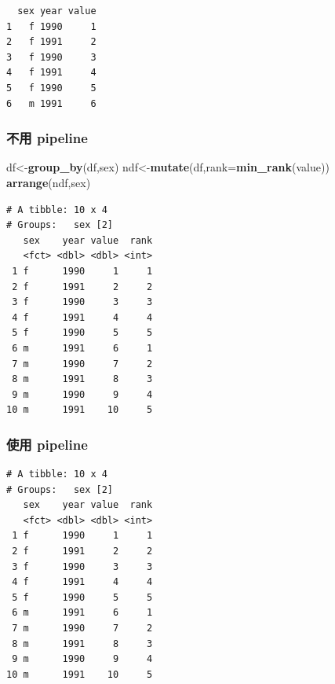 \documentclass[]{book}
\newenvironment{Shaded}{\begin{snugshade}}{\end{snugshade}}
\newcommand{\DataTypeTok}[1]{\textcolor[rgb]{0.13,0.29,0.53}{#1}}
\newcommand{\KeywordTok}[1]{\textcolor[rgb]{0.13,0.29,0.53}{\textbf{#1}}}
\newcommand{\NormalTok}[1]{#1}
\newcommand{\OperatorTok}[1]{\textcolor[rgb]{0.81,0.36,0.00}{\textbf{#1}}}
\newcommand{\StringTok}[1]{\textcolor[rgb]{0.31,0.60,0.02}{#1}}
\theoremstyle{definition}
\theoremstyle{definition}
\theoremstyle{definition}
\theoremstyle{remark}
\begin{document}
\begin{verbatim}
  sex year value
1   f 1990     1
2   f 1991     2
3   f 1990     3
4   f 1991     4
5   f 1990     5
6   m 1991     6
\end{verbatim}

\hypertarget{-pipeline}{%
\subsubsection{不用 pipeline}\label{-pipeline}}

\begin{Shaded}
\begin{Highlighting}[]
\NormalTok{df<-}\KeywordTok{group_by}\NormalTok{(df,sex)}
\NormalTok{ndf<-}\KeywordTok{mutate}\NormalTok{(df,}\DataTypeTok{rank=}\KeywordTok{min_rank}\NormalTok{(value))}
\KeywordTok{arrange}\NormalTok{(ndf,sex)}
\end{Highlighting}
\end{Shaded}

\begin{verbatim}
# A tibble: 10 x 4
# Groups:   sex [2]
   sex    year value  rank
   <fct> <dbl> <dbl> <int>
 1 f      1990     1     1
 2 f      1991     2     2
 3 f      1990     3     3
 4 f      1991     4     4
 5 f      1990     5     5
 6 m      1991     6     1
 7 m      1990     7     2
 8 m      1991     8     3
 9 m      1990     9     4
10 m      1991    10     5
\end{verbatim}

\hypertarget{-pipeline}{%
\subsubsection{使用 pipeline}\label{-pipeline}}

\begin{Shaded}
\end{Shaded}

\begin{verbatim}
# A tibble: 10 x 4
# Groups:   sex [2]
   sex    year value  rank
   <fct> <dbl> <dbl> <int>
 1 f      1990     1     1
 2 f      1991     2     2
 3 f      1990     3     3
 4 f      1991     4     4
 5 f      1990     5     5
 6 m      1991     6     1
 7 m      1990     7     2
 8 m      1991     8     3
 9 m      1990     9     4
10 m      1991    10     5
\end{verbatim}
\end{document}
